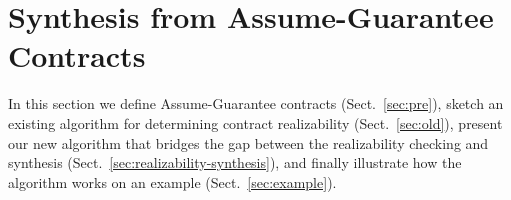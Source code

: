 
\section{Synthesis from Assume-Guarantee Contracts}
\label{sec:kinductionsynth}

%
In this section we define  %
Assume-Guarantee contracts (Sect.~\ref{sec:pre}),
 sketch an existing algorithm for determining contract realizability
(Sect.~\ref{sec:old}),
present our new algorithm that bridges the gap between the realizability checking and synthesis (Sect.~\ref{sec:realizability-synthesis}),
and finally illustrate how the algorithm works on an example
(Sect.~\ref{sec:example}).

